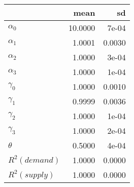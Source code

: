 
\begin{tabular}[t]{lrr}
\toprule
  & mean & sd\\
\midrule
$\alpha_{0}$ & 10.0000 & 7e-04\\
$\alpha_{1}$ & 1.0001 & 0.0030\\
$\alpha_{2}$ & 1.0000 & 3e-04\\
$\alpha_{3}$ & 1.0000 & 1e-04\\
$\gamma_{0}$ & 1.0000 & 0.0010\\
$\gamma_{1}$ & 0.9999 & 0.0036\\
$\gamma_{2}$ & 1.0000 & 1e-04\\
$\gamma_{3}$ & 1.0000 & 2e-04\\
$\theta$ & 0.5000 & 4e-04\\
$R^{2} (demand)$ & 1.0000 & 0.0000\\
$R^{2} (supply)$ & 1.0000 & 0.0000\\
\bottomrule
\end{tabular}
